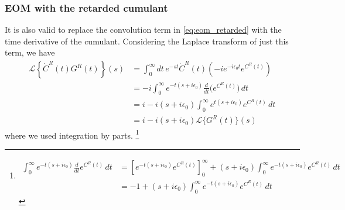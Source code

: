 \subsubsection{EOM with the retarded cumulant}
It is also valid to replace the convolution term in \eqref{eq:eom_retarded} with the time derivative of the cumulant. Considering the Laplace transform of just this term, we have
\begin{align}
\mathcal{L}\left\{\dot{C}^R(t)G^R(t)\right\}(s)
&=\int_0^\infty dt\, e^{-s t} \dot{C}^R(t) \left(-i e^{-i \epsilon_0 t} e^{C^R(t)}\right) \\
&= -i \int_0^\infty e^{-t(s + i\epsilon_0)} \frac{d}{dt}\big(e^{C^R(t)}\big)\, dt \label{eq:integration_by_parts}\\
&= i - i(s + i\epsilon_0)\int_0^\infty e^{t(s + i\epsilon_0)} e^{C^R(t)}\,dt \label{id}\\
&= i - i(s + i\epsilon_0)\mathcal{L}\{G^R(t)\}(s)
\end{align}
where we used integration by parts.
\footnote{\begin{align}
\int_0^\infty e^{-t(s + i\epsilon_0)} \frac{d}{dt}e^{C^R(t)}\,dt
&= \left[e^{-t(s + i\epsilon_0)} e^{C^R(t)}\right]_0^\infty 
+ (s + i\epsilon_0)\int_0^\infty e^{-t(s + i\epsilon_0)} e^{C^R(t)}\,dt \\
&= -1 + (s + i\epsilon_0)\int_0^\infty e^{-t(s + i\epsilon_0)} e^{C^R(t)}\,dt
\end{align}}
